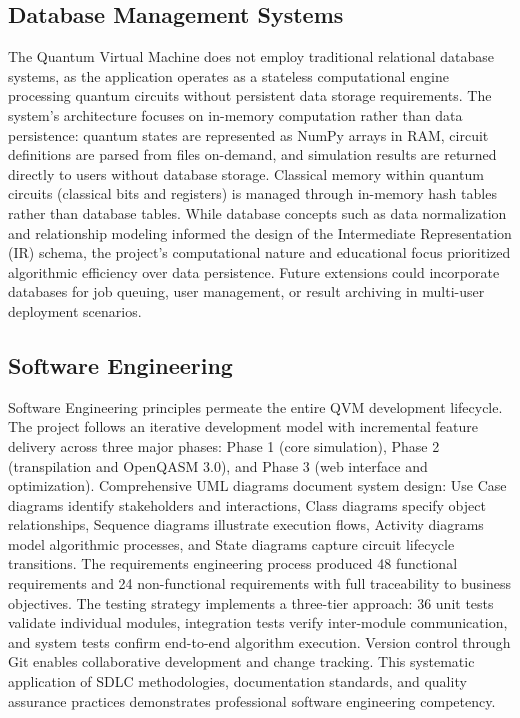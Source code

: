 \subsection{Database Management Systems}

The Quantum Virtual Machine does not employ traditional relational database systems, as the application operates as a stateless computational engine processing quantum circuits without persistent data storage requirements. The system's architecture focuses on in-memory computation rather than data persistence: quantum states are represented as NumPy arrays in RAM, circuit definitions are parsed from files on-demand, and simulation results are returned directly to users without database storage. Classical memory within quantum circuits (classical bits and registers) is managed through in-memory hash tables rather than database tables. While database concepts such as data normalization and relationship modeling informed the design of the Intermediate Representation (IR) schema, the project's computational nature and educational focus prioritized algorithmic efficiency over data persistence. Future extensions could incorporate databases for job queuing, user management, or result archiving in multi-user deployment scenarios.


\subsection{Software Engineering}

Software Engineering principles permeate the entire QVM development lifecycle. The project follows an iterative development model with incremental feature delivery across three major phases: Phase 1 (core simulation), Phase 2 (transpilation and OpenQASM 3.0), and Phase 3 (web interface and optimization). Comprehensive UML diagrams document system design: Use Case diagrams identify stakeholders and interactions, Class diagrams specify object relationships, Sequence diagrams illustrate execution flows, Activity diagrams model algorithmic processes, and State diagrams capture circuit lifecycle transitions. The requirements engineering process produced 48 functional requirements and 24 non-functional requirements with full traceability to business objectives. The testing strategy implements a three-tier approach: 36 unit tests validate individual modules, integration tests verify inter-module communication, and system tests confirm end-to-end algorithm execution. Version control through Git enables collaborative development and change tracking. This systematic application of SDLC methodologies, documentation standards, and quality assurance practices demonstrates professional software engineering competency.


